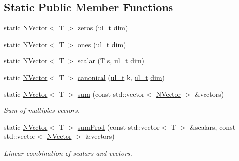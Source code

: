 \subsection*{Static Public Member Functions}
\begin{DoxyCompactItemize}
\item 
static \mbox{\hyperlink{class_n_vector}{N\+Vector}}$<$ T $>$ \mbox{\hyperlink{class_n_vector_a6253cef3c39dd9d388bbf7d17069bc51}{zeros}} (\mbox{\hyperlink{typedef_8h_a1b140a2034db3f5dfe18a987745df43a}{ul\+\_\+t}} \mbox{\hyperlink{class_n_vector_a7589027db20509ac4d93490bb9a1979a}{dim}})
\item 
static \mbox{\hyperlink{class_n_vector}{N\+Vector}}$<$ T $>$ \mbox{\hyperlink{class_n_vector_afb6358454a8dfaac4963352843b17bbc}{ones}} (\mbox{\hyperlink{typedef_8h_a1b140a2034db3f5dfe18a987745df43a}{ul\+\_\+t}} \mbox{\hyperlink{class_n_vector_a7589027db20509ac4d93490bb9a1979a}{dim}})
\item 
static \mbox{\hyperlink{class_n_vector}{N\+Vector}}$<$ T $>$ \mbox{\hyperlink{class_n_vector_add6abbdea5f58e6887367860aa0f619d}{scalar}} (T s, \mbox{\hyperlink{typedef_8h_a1b140a2034db3f5dfe18a987745df43a}{ul\+\_\+t}} \mbox{\hyperlink{class_n_vector_a7589027db20509ac4d93490bb9a1979a}{dim}})
\item 
static \mbox{\hyperlink{class_n_vector}{N\+Vector}}$<$ T $>$ \mbox{\hyperlink{class_n_vector_a37b19eb888023546363e952cd39ea3a1}{canonical}} (\mbox{\hyperlink{typedef_8h_a1b140a2034db3f5dfe18a987745df43a}{ul\+\_\+t}} k, \mbox{\hyperlink{typedef_8h_a1b140a2034db3f5dfe18a987745df43a}{ul\+\_\+t}} \mbox{\hyperlink{class_n_vector_a7589027db20509ac4d93490bb9a1979a}{dim}})
\item 
static \mbox{\hyperlink{class_n_vector}{N\+Vector}}$<$ T $>$ \mbox{\hyperlink{class_n_vector_af0f5749405554fc23a0af67ad4f9e9e5}{sum}} (const std\+::vector$<$ \mbox{\hyperlink{class_n_vector}{N\+Vector}} $>$ \&vectors)
\begin{DoxyCompactList}\small\item\em Sum of multiples vectors. \end{DoxyCompactList}\item 
static \mbox{\hyperlink{class_n_vector}{N\+Vector}}$<$ T $>$ \mbox{\hyperlink{class_n_vector_a89ea4dcaa84313e6446e0be35ec7bbe1}{sum\+Prod}} (const std\+::vector$<$ T $>$ \&scalars, const std\+::vector$<$ \mbox{\hyperlink{class_n_vector}{N\+Vector}} $>$ \&vectors)
\begin{DoxyCompactList}\small\item\em Linear combination of {\ttfamily scalars} and {\ttfamily vectors}. \end{DoxyCompactList}\end{DoxyCompactItemize}
